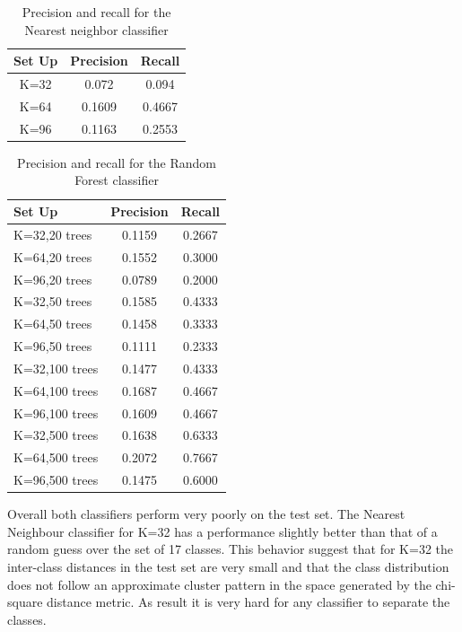 \documentclass[10pt,twocolumn,letterpaper]{article}
\begin{document}
\begin{table}[t]
\centering
\begin{tabular}{c | c | c}
Set Up & Precision & Recall   \\
\hline	
K=32 & 0.072 & 0.094 \\
K=64 & 0.1609 & 0.4667 \\
K=96 &  0.1163&  0.2553 \\

\end{tabular}
\caption{Precision and recall for the Nearest neighbor classifier}
\label{table:table1}
\end{table}


\begin{table}[t]
\centering
\begin{tabular}{ l | c | c}
Set Up & Precision & Recall   \\
\hline	
K=32,20 trees & 0.1159 & 0.2667 \\
K=64,20 trees & 0.1552 & 0.3000 \\
K=96,20 trees & 0.0789  &  0.2000 \\
K=32,50 trees & 0.1585 & 0.4333 \\
K=64,50 trees & 0.1458 & 0.3333 \\
K=96,50 trees &  0.1111 &  0.2333\\
K=32,100 trees & 0.1477 & 0.4333  \\
K=64,100 trees & 0.1687 & 0.4667  \\
K=96,100 trees & 0.1609 &  0.4667\\
K=32,500 trees & 0.1638 & 0.6333  \\
K=64,500 trees & 0.2072  &  0.7667 \\
K=96,500 trees & 0.1475 & 0.6000  \\

\end{tabular}
\caption{Precision and recall for the Random Forest classifier}
\label{table:table2}
\end{table}


Overall both classifiers perform very poorly on the test set. The Nearest Neighbour classifier for K=32 has a performance slightly better than that of a random guess over the set of 17 classes. This behavior suggest that for K=32 the inter-class distances in the test set are very small and that the class distribution does not follow an approximate cluster pattern in the space generated by the chi-square distance metric. As result it is very hard for any classifier to separate the classes.
\end{document}
